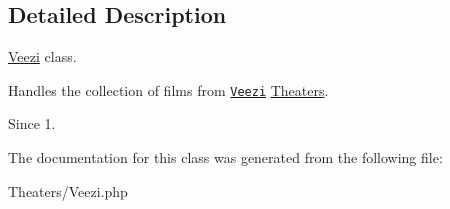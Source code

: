 \subsection{Detailed Description}
\hyperlink{classJeero_1_1Theaters_1_1Veezi}{Veezi} class.

Handles the collection of films from \href{https://www.veezi.com/}{\tt Veezi} \hyperlink{namespaceJeero_1_1Theaters}{Theaters}.

\begin{DoxySince}{Since}
1. 
\end{DoxySince}


The documentation for this class was generated from the following file\+:\begin{DoxyCompactItemize}
\item 
Theaters/Veezi.\+php\end{DoxyCompactItemize}
